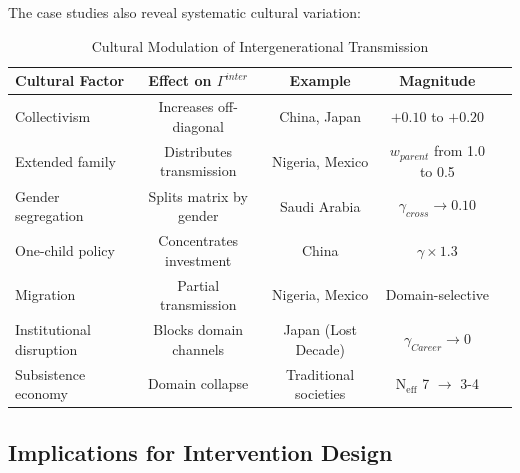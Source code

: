The case studies also reveal systematic cultural variation:

\begin{table}[htbp]
\centering
\caption{Cultural Modulation of Intergenerational Transmission}
\label{tab:BI-cultural-synthesis}
\renewcommand{\arraystretch}{1.3}
\small
\begin{tabular}{@{}lcccc@{}}
\toprule
\textbf{Cultural Factor} & \textbf{Effect on $\Gamma^{inter}$} & \textbf{Example} & \textbf{Magnitude} \\
\midrule
Collectivism & Increases off-diagonal & China, Japan & $+0.10$ to $+0.20$ \\
Extended family & Distributes transmission & Nigeria, Mexico & $w_{parent}$ from 1.0 to 0.5 \\
Gender segregation & Splits matrix by gender & Saudi Arabia & $\gamma_{cross} \rightarrow 0.10$ \\
One-child policy & Concentrates investment & China & $\gamma \times 1.3$ \\
Migration & Partial transmission & Nigeria, Mexico & Domain-selective \\
Institutional disruption & Blocks domain channels & Japan (Lost Decade) & $\gamma_{Career} \rightarrow 0$ \\
Subsistence economy & Domain collapse & Traditional societies & N$_{\text{eff}}$ 7 $\rightarrow$ 3-4 \\
\bottomrule
\end{tabular}
\end{table}

\subsection{Implications for Intervention Design}

